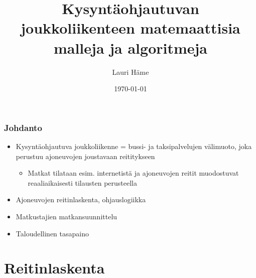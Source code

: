 \documentclass{beamer}
\title[Aalto-yliopiston perustieteiden korkeakoulu]{Kysyntäohjautuvan joukkoliikenteen matemaattisia malleja ja algoritmeja}
\author[L. Häme]{Lauri Häme}                 %
\institute[Aalto-yliopiston perustieteiden korkeakoulu]{Aalto-yliopiston perustieteiden korkeakoulu}      %
\date{\today}      %
\begin{document}
\begin{frame}
  \titlepage
\end{frame}


\begin{frame}
  \frametitle{Johdanto}   %
  \begin{itemize}
    \item 
Kysyntäohjautuva joukkoliikenne = bussi- ja taksipalvelujen välimuoto, joka perustuu ajoneuvojen joustavaan reititykseen
\begin{itemize}
 \item 
 Matkat tilataan esim. internetistä ja ajoneuvojen reitit muodostuvat reaaliaikaisesti tilausten perusteella
\end{itemize}
\item
Ajoneuvojen reitinlaskenta, ohjauslogiikka
\item
Matkustajien matkansuunnittelu
\item
Taloudellinen tasapaino
\end{itemize}


 
\end{frame}

\section{Reitinlaskenta}
\end{document}
